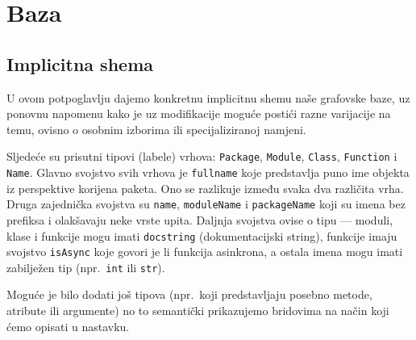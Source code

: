 \section{Baza}

\subsection{Implicitna shema} \label{subsec:implicitna}
U ovom potpoglavlju dajemo konkretnu implicitnu shemu naše grafovske baze,
uz ponovnu napomenu kako je uz modifikacije moguće postići razne varijacije na temu,
ovisno o osobnim izborima ili specijaliziranoj namjeni.

Sljedeće su prisutni tipovi (labele) vrhova: \texttt{Package},
\texttt{Module}, \texttt{Class}, \texttt{Function} i \texttt{Name}.
Glavno svojstvo svih vrhova je \texttt{fullname} koje predstavlja
puno ime objekta iz perspektive korijena paketa. Ono se razlikuje između
svaka dva različita vrha. Druga zajednička svojstva su \texttt{name},
\texttt{moduleName} i \texttt{packageName} koji su imena
bez prefiksa i olakšavaju neke vrste upita. Daljnja svojstva ovise o
tipu --- moduli, klase i funkcije mogu imati \texttt{docstring} (dokumentacijski string),
funkcije imaju svojstvo \texttt{isAsync} koje govori je li funkcija asinkrona, a
ostala imena mogu imati zabilježen tip (npr.\ \texttt{int} ili \texttt{str}).

Moguće je bilo dodati još tipova (npr.\ koji predstavljaju posebno metode,
atribute ili argumente) no to semantički prikazujemo bridovima na način koji ćemo opisati
u nastavku.

